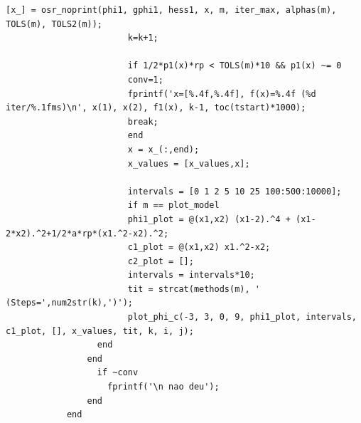 \documentclass[10pt, a4paper]{article}
\begin{document}
\begin{minipage}{\linewidth}
\begin{lstlisting}[style=myStyle, caption= trecho de c\'odigo do problema 01 (penalidade), label=list_p01_pen]
                        [x_] = osr_noprint(phi1, gphi1, hess1, x, m, iter_max, alphas(m), TOLS(m), TOLS2(m));
                        k=k+1;

                        if 1/2*p1(x)*rp < TOLS(m)*10 && p1(x) ~= 0
                        conv=1;
                        fprintf('x=[%.4f,%.4f], f(x)=%.4f (%d iter/%.1fms)\n', x(1), x(2), f1(x), k-1, toc(tstart)*1000);
                        break;
                        end
                        x = x_(:,end);
                        x_values = [x_values,x];

                        intervals = [0 1 2 5 10 25 100:500:10000];
                        if m == plot_model
                        phi1_plot = @(x1,x2) (x1-2).^4 + (x1-2*x2).^2+1/2*a*rp*(x1.^2-x2).^2;
                        c1_plot = @(x1,x2) x1.^2-x2;
                        c2_plot = [];
                        intervals = intervals*10;
                        tit = strcat(methods(m), ' (Steps=',num2str(k),')');
                        plot_phi_c(-3, 3, 0, 9, phi1_plot, intervals, c1_plot, [], x_values, tit, k, i, j);
                  end
                end
                  if ~conv
                    fprintf('\n nao deu');
                end
            end
      \end{lstlisting}
\end{minipage}
\end{document}
